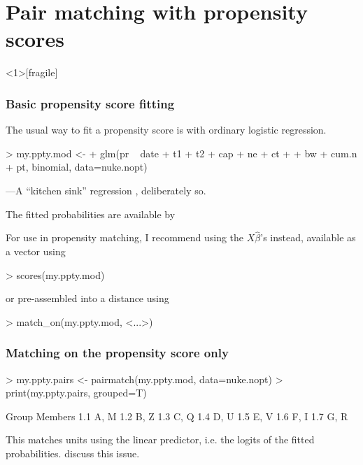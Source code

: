 \section{Pair matching with propensity scores}


\begin{frame}<1>[fragile]
  \frametitle{Basic propensity score fitting}

The usual way to fit a propensity score is with ordinary logistic regression.
\begin{Schunk}
\begin{Sinput}
> my.ppty.mod <- 
+   glm(pr ~ date + t1 + t2 + cap + ne + ct + 
+       bw + cum.n + pt, binomial, data=nuke.nopt)
\end{Sinput}
\end{Schunk}
\pause%
---A ``kitchen sink'' regression \citet{rubin:thom:1996}, deliberately so.\pause

The fitted probabilities are available by
\begin{Schunk}
\end{Schunk}

For use in propensity matching, I recommend using the $X\hat{\beta}$'s instead, available as a vector using
\begin{Schunk}
\begin{Sinput}
> scores(my.ppty.mod)
\end{Sinput}
\end{Schunk}
or pre-assembled into a distance using 

\begin{Schunk}
\begin{Sinput}
> match_on(my.ppty.mod, <...>)
\end{Sinput}
\end{Schunk}

\end{frame}
\begin{frame}[fragile]
  \frametitle{Matching on the propensity score only}


\begin{Schunk}
\begin{Sinput}
> my.ppty.pairs <- pairmatch(my.ppty.mod, data=nuke.nopt)
> print(my.ppty.pairs, grouped=T)
\end{Sinput}
\begin{Soutput}
 Group Members
   1.1    A, M
   1.2    B, Z
   1.3    C, Q
   1.4    D, U
   1.5    E, V
   1.6    F, I
   1.7    G, R
\end{Soutput}
\end{Schunk}

This matches units using the linear predictor, i.e. the logits of the fitted probabilities.  \citet*{rosenbaum:rubi:1985a} discuss this issue.
\end{frame}


